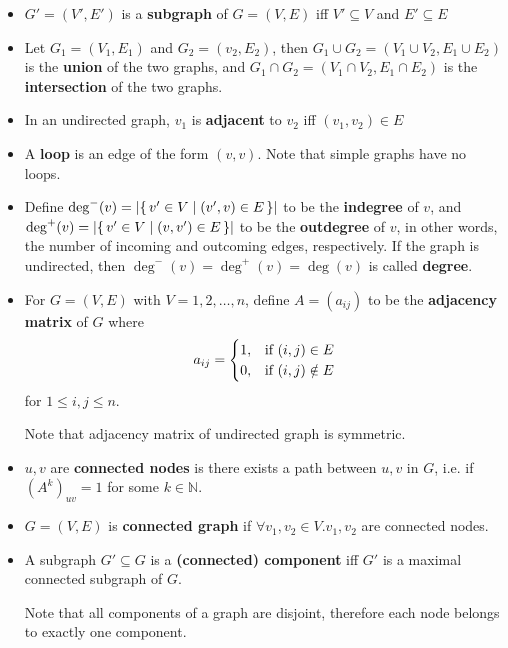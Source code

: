 \begin{definition}
    \begin{itemize}[leftmargin=*]
        \item $G' = (V', E')$ is a \textbf{subgraph} of $G = (V, E)$ iff $V' \subseteq V$ and $E' \subseteq E$
        \item Let $G_1 = (V_1, E_1)$ and $G_2 = (v_2, E_2)$, then $G_1 \cup G_2 = (V_1 \cup V_2, E_1 \cup E_2)$ is the \textbf{union} of the two graphs, and $G_1 \cap G_2 = (V_1 {\cap} V_2, E_1 {\cap} E_2)$ is the \textbf{intersection} of the two graphs.
    \end{itemize}
\end{definition}

\begin{definition}
    \begin{itemize}[leftmargin=*]
        \item In an undirected graph, $v_1$ is \textbf{adjacent} to $v_2$ iff $(v_1, v_2) \in E$
        \item A \textbf{loop} is an edge of the form $(v, v)$.
        Note that simple graphs have no loops.
        \item Define $\deg^-(v) = \left| \{\, v' \in V \mid (v', v) \in E \, \} \right|$ to be the \textbf{indegree} of $v$, and $\deg^+(v) = \left| \{\, v' \in V \mid (v, v') \in E \, \} \right|$ to be the \textbf{outdegree} of $v$, in other words, the number of incoming and outcoming edges, respectively.
        If the graph is undirected, then $\deg^-(v) = \deg^+(v) = \deg(v)$ is called \textbf{degree}.
        \item For $G = (V, E)$ with $V = {1, 2, \dots, n}$, define $A = (a_{ij})$ to be the \textbf{adjacency matrix} of $G$ where
        \[ a_{ij} = \begin{cases}
                        1, & \textnormal{if}\ (i, j) \in E \\
                        0, & \textnormal{if}\ (i, j) \notin E
        \end{cases} \]
        for $1 \leq i, j \leq n$.
        
        Note that adjacency matrix of undirected graph is symmetric.
    \end{itemize}
\end{definition}

\begin{definition}[Connectedness]
    \begin{itemize}[leftmargin=*]
        \item $u, v$ are \textbf{connected nodes} is there exists a path between $u, v$ in $G$, i.e. if $(A^k)_{uv} = 1$ for some $k\in \mathbb{N}$.
        \item $G = (V, E)$ is \textbf{connected graph} if $\forall v_1, v_2 \in V. v_1, v_2$ are connected nodes.
        \item A subgraph $G' \subseteq G$ is a \textbf{(connected) component} iff $G'$ is a maximal connected subgraph of $G$.
        
        Note that all components of a graph are disjoint, therefore each node belongs to exactly one component.
    \end{itemize}
\end{definition}


